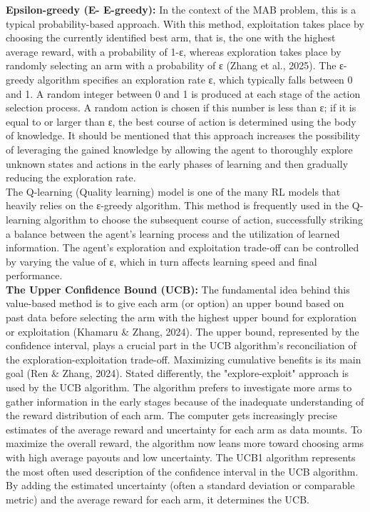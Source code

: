 \documentclass[a4paper,11pt,onecolumn]{article}
\begin{document}
\textbf{Epsilon-greedy (E- E-greedy):} In the context of the MAB problem, this is a typical probability-based approach. With this method, exploitation takes place by choosing the currently identified best arm, that is, the one with the highest average reward, with a probability of 1-ε, whereas exploration takes place by randomly selecting an arm with a probability of ε (Zhang et al., 2025). The ε-greedy algorithm specifies an exploration rate ε, which typically falls between 0 and 1. A random integer between 0 and 1 is produced at each stage of the action selection process. A random action is chosen if this number is less than ε; if it is equal to or larger than ε, the best course of action is determined using the body of knowledge. It should be mentioned that this approach increases the possibility of leveraging the gained knowledge by allowing the agent to thoroughly explore unknown states and actions in the early phases of learning and then gradually reducing the exploration rate.\\
The Q-learning (Quality learning) model is one of the many RL models that heavily relies on the ε-greedy algorithm. This method is frequently used in the Q-learning algorithm to choose the subsequent course of action, successfully striking a balance between the agent's learning process and the utilization of learned information. The agent's exploration and exploitation trade-off can be controlled by varying the value of ε, which in turn affects learning speed and final performance.\\
\textbf{The Upper Confidence Bound (UCB):} The fundamental idea behind this value-based method is to give each arm (or option) an upper bound based on past data before selecting the arm with the highest upper bound for exploration or exploitation (Khamaru & Zhang, 2024). The upper bound, represented by the confidence interval, plays a crucial part in the UCB algorithm's reconciliation of the exploration-exploitation trade-off. Maximizing cumulative benefits is its main goal (Ren & Zhang, 2024). Stated differently, the "explore-exploit" approach is used by the UCB algorithm. The algorithm prefers to investigate more arms to gather information in the early stages because of the inadequate understanding of the reward distribution of each arm. The computer gets increasingly precise estimates of the average reward and uncertainty for each arm as data mounts. To maximize the overall reward, the algorithm now leans more toward choosing arms with high average payouts and low uncertainty. The UCB1 algorithm represents the most often used description of the confidence interval in the UCB algorithm. By adding the estimated uncertainty (often a standard deviation or comparable metric) and the average reward for each arm, it determines the UCB.\\
\end{document}
